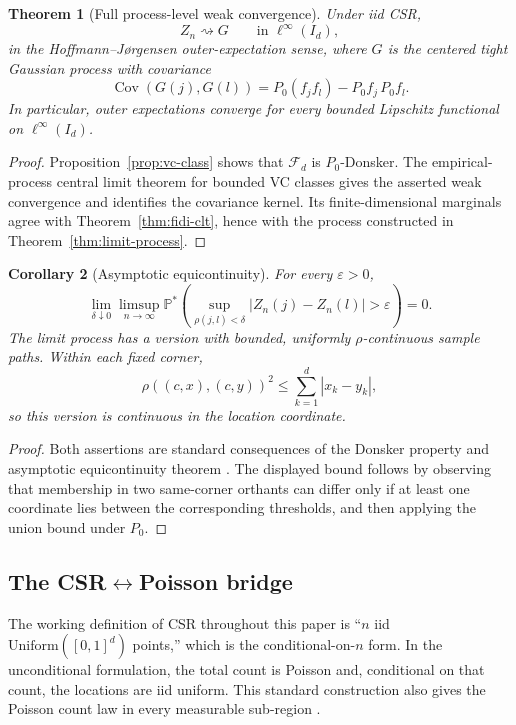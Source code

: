 \documentclass[pdflatex]{sn-jnl}
\theoremstyle{thmstyleone}
\newtheorem{theorem}{Theorem}[section]
\newtheorem{corollary}[theorem]{Corollary}
\theoremstyle{thmstyletwo}
\theoremstyle{thmstylethree}
\newcommand{\Prob}{\mathbb{P}}
\DeclareMathOperator{\Cov}{Cov}
\begin{document}
\begin{theorem}[Full process-level weak convergence]\label{thm:process-outer-wc}
Under iid CSR,
\[
  Z_n\rightsquigarrow G
  \qquad\text{in }\ell^\infty(I_d),
\]
in the Hoffmann--J\o rgensen outer-expectation sense, where $G$ is the centered tight Gaussian process with covariance
\[
  \Cov(G(j),G(l))
  =P_0(f_jf_l)-P_0f_j\,P_0f_l.
\]
In particular, outer expectations converge for every bounded Lipschitz functional on $\ell^\infty(I_d)$.
\end{theorem}

\begin{proof}
Proposition~\ref{prop:vc-class} shows that $\mathcal F_d$ is $P_0$-Donsker. The empirical-process central limit theorem for bounded VC classes gives the asserted weak convergence and identifies the covariance kernel. Its finite-dimensional marginals agree with Theorem~\ref{thm:fidi-clt}, hence with the process constructed in Theorem~\ref{thm:limit-process}.
\end{proof}

\begin{corollary}[Asymptotic equicontinuity]\label{thm:equicontinuity}
For every $\varepsilon>0$,
\[
  \lim_{\delta\downarrow0}\limsup_{n\to\infty}
  \Prob^*\!\left(
    \sup_{\rho(j,l)<\delta}|Z_n(j)-Z_n(l)|>\varepsilon
  \right)=0.
\]
The limit process has a version with bounded, uniformly $\rho$-continuous sample paths. Within each fixed corner,
\[
  \rho((c,x),(c,y))^2\le\sum_{k=1}^d|x_k-y_k|,
\]
so this version is continuous in the location coordinate.
\end{corollary}

\begin{proof}
Both assertions are standard consequences of the Donsker property and asymptotic equicontinuity theorem \cite[Thm.~1.5.7]{vanderVaartWellner1996}. The displayed bound follows by observing that membership in two same-corner orthants can differ only if at least one coordinate lies between the corresponding thresholds, and then applying the union bound under $P_0$.
\end{proof}

\subsection{The \texorpdfstring{CSR$\leftrightarrow$Poisson}{CSR--Poisson} bridge}\label{sec:poisson}

The working definition of CSR throughout this paper is ``$n$ iid $\mathrm{Uniform}([0,1]^d)$ points,'' which is the conditional-on-$n$ form. In the unconditional formulation, the total count is Poisson and, conditional on that count, the locations are iid uniform. This standard construction also gives the Poisson count law in every measurable sub-region \cite[Example~16.2]{vanLieshout2010}.
\end{document}
